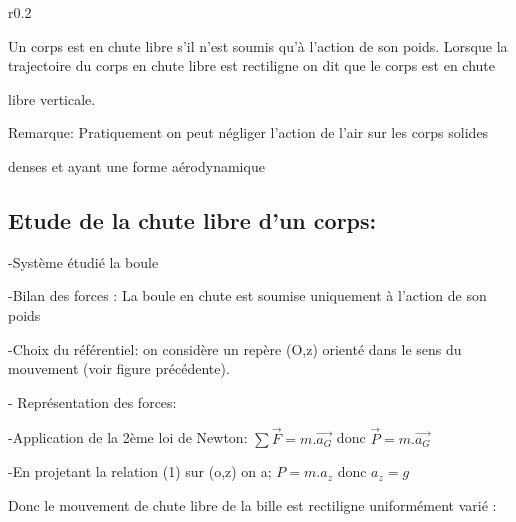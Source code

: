 \documentclass[12pt]{article}
\begin{document}
\begin{wrapfigure}[1]{r}{0.2\textwidth}
	\vspace{-2cm}
\end{wrapfigure}


Un corps est en chute libre s'il n'est soumis qu'à l'action de son poids.
Lorsque la trajectoire du corps en chute libre est rectiligne on dit que le corps est en chute 

libre verticale.

Remarque: Pratiquement on peut négliger l'action de l'air sur les corps solides 

denses et ayant une forme aérodynamique

\subsection{Etude de la chute libre d'un corps:}


-Système étudié {la boule}

-Bilan des forces : La boule en chute est soumise uniquement à l'action de son poids

-Choix du référentiel: on considère un repère (O,z) orienté dans le sens du mouvement (voir figure précédente).

- Représentation des forces:

-Application de la 2ème loi de Newton: $\sum \vec{F} = m.\vec{a_G}$ donc $\vec{P} = m.\vec{a_G}$

-En projetant la relation (1) sur (o,z) on a; $P=m.a_z$ donc $a_z=g$

Donc le mouvement de chute libre de la bille est rectiligne uniformément varié :
\end{document}

